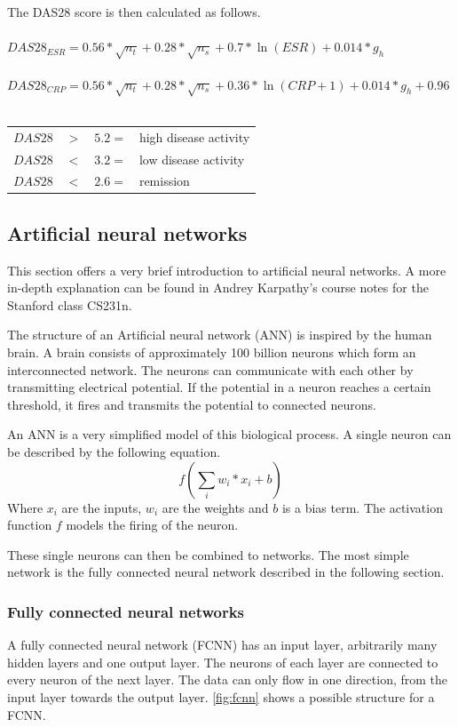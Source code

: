 \documentclass[12pt]{article}
\begin{document}
The DAS28 score is then calculated as follows. \cite{runmc_formula}
\\
\\
$DAS28_{ESR} = 0.56 * \sqrt{n_t} + 0.28 * \sqrt{n_s} + 0.7 * \ln{(ESR)} + 0.014 * g_h$
\\
\\
$DAS28_{CRP} = 0.56 * \sqrt{n_t} + 0.28 * \sqrt{n_s} + 0.36 * \ln{(CRP + 1)} + 0.014 * g_h + 0.96$
\\
\\
\begin{tabular}{@{}llll}
$DAS28$ & $>$ & $5.2 =$ & high disease activity \\
$DAS28$ & $<$ & $3.2 =$ & low disease activity \\
$DAS28$ & $<$ & $2.6 =$ & remission
\end{tabular}

\subsection{Artificial neural networks}
\label{subsec:ann}
This section offers a very brief introduction to artificial neural networks. A more in-depth explanation can be found in Andrey Karpathy's course notes for the Stanford class CS231n. \cite{karpathy}

The structure of an Artificial neural network (ANN) is inspired by the human brain. A brain consists of approximately 100 billion neurons which form an interconnected network. The neurons can communicate with each other by transmitting electrical potential. If the potential in a neuron reaches a certain threshold, it fires and transmits the potential to connected neurons. \cite{kruse_2016}

An ANN is a very simplified model of this biological process. A single neuron can be described by the following equation. $$f\left(\sum_{i}w_i*x_i+b\right)$$ Where $x_i$ are the inputs, $w_i$ are the weights and $b$ is a bias term. The activation function $f$ models the firing of the neuron.

These single neurons can then be combined to networks. The most simple network is the fully connected neural network described in the following section.

\subsubsection{Fully connected neural networks}
\label{subsubsec:fcnn}
A fully connected neural network (FCNN) has an input layer, arbitrarily many hidden layers and one output layer. The neurons of each layer are connected to every neuron of the next layer. The data  can only flow in one direction, from the input layer towards the output layer. \autoref{fig:fcnn} shows a possible structure for a FCNN.
\end{document}
